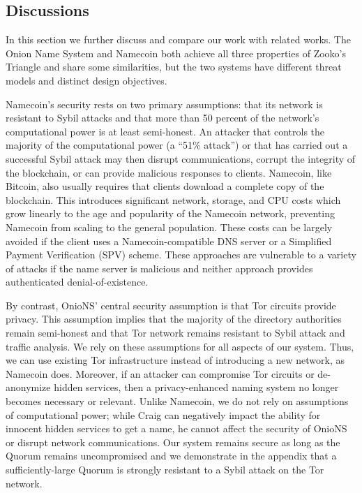 \documentclass[USenglish,oneside,twocolumn]{article}
\begin{document}
\subsection{Discussions}

In this section we further discuss and compare our work with related works. The Onion Name System and Namecoin both achieve all three properties of Zooko's Triangle and share some similarities, but the two systems have different threat models and distinct design objectives.

Namecoin's security rests on two primary assumptions: that its network is resistant to Sybil attacks and that more than 50 percent of the network's computational power is at least semi-honest. An attacker that controls the majority of the computational power (a ``51\% attack'') or that has carried out a successful Sybil attack may then disrupt communications, corrupt the integrity of the blockchain, or can provide malicious responses to clients. Namecoin, like Bitcoin, also usually requires that clients download a complete copy of the blockchain. This introduces significant network, storage, and CPU costs which grow linearly to the age and popularity of the Namecoin network, preventing Namecoin from scaling to the general population. These costs can be largely avoided if the client uses a Namecoin-compatible DNS server or a Simplified Payment Verification \cite{nakamoto2008bitcoin} (SPV) scheme. These approaches are vulnerable to a variety of attacks if the name server is malicious and neither approach provides authenticated denial-of-existence.

By contrast, OnioNS' central security assumption is that Tor circuits provide privacy. This assumption implies that the majority of the directory authorities remain semi-honest and that Tor network remains resistant to Sybil attack and traffic analysis. We rely on these assumptions for all aspects of our system. Thus, we can use existing Tor infrastructure instead of introducing a new network, as Namecoin does. Moreover, if an attacker can compromise Tor circuits or de-anonymize hidden services, then a privacy-enhanced naming system no longer becomes necessary or relevant. Unlike Namecoin, we do not rely on assumptions of computational power; while Craig can negatively impact the ability for innocent hidden services to get a name, he cannot affect the security of OnioNS or disrupt network communications. Our system remains secure as long as the Quorum remains uncompromised and we demonstrate in the appendix that a sufficiently-large Quorum is strongly resistant to a Sybil attack on the Tor network.
\end{document}
